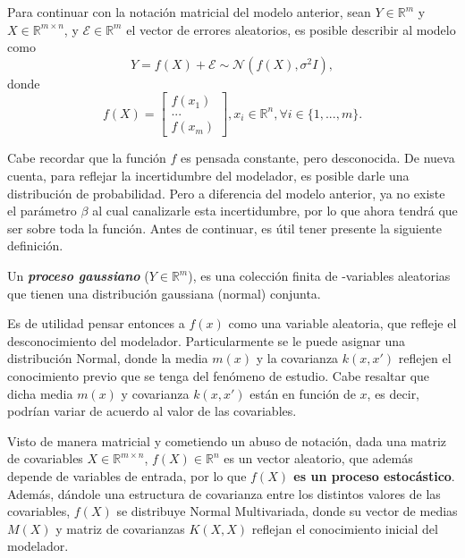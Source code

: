 Para continuar con la notación matricial del modelo anterior, sean $Y \in \mathbb{R}^m$ y $X \in \mathbb{R}^{m \times n}$, y $\mathcal{E} \in \mathbb{R}^m$ el vector de errores aleatorios, es posible describir al modelo como
\begin{equation*}
    Y = f(X) + \mathcal{E} \sim \mathcal{N}(f(X),\sigma^2 I),
\end{equation*}
donde
\begin{equation*}
    f(X) =     
    \left[
        \begin{array}{c}
        f(x_1)  \\
        ... \\
        f(x_m)
        \end{array}
    \right], 
    x_i \in \mathbb{R}^n, \forall i \in \{1,...,m\}.
\end{equation*}

Cabe recordar que la función $f$ es pensada constante, pero desconocida. De nueva cuenta, para reflejar la incertidumbre del modelador, es posible darle una distribución de probabilidad. Pero a diferencia del modelo anterior, ya no existe el parámetro $\beta$ al cual canalizarle esta incertidumbre, por lo que ahora tendrá que ser sobre toda la función. Antes de continuar, es útil tener presente la siguiente definición.

\begin{defin}
    Un \textbf{\textit{proceso gaussiano}} ($Y \in \mathbb{R}^m$), es una colección finita de -variables aleatorias que tienen una distribución gaussiana (normal) conjunta.
\end{defin}

Es de utilidad pensar entonces a $f(x)$ como una variable aleatoria, que refleje el desconocimiento del modelador. Particularmente se le puede asignar una distribución Normal, donde la media $m(x)$ y la covarianza $k(x,x')$ reflejen el conocimiento previo que se tenga del fenómeno de estudio. Cabe resaltar que dicha media $m(x)$ y covarianza $k(x,x')$ están en función de $x$, es decir, podrían variar de acuerdo al valor de las covariables. 

Visto de manera matricial y cometiendo un abuso de notaci\'on, dada una matriz de covariables $X \in \mathbb{R}^{m \times n}$, $f(X) \in \mathbb{R}^n$ es un vector aleatorio, que adem\'as depende de variables de entrada, por lo que \textbf{$f(X)$ es un proceso estoc\'astico}. Adem\'as, d\'andole una estructura de covarianza entre los distintos valores de las covariables, $f(X)$ se distribuye Normal Multivariada, donde su vector de medias $M(X)$ y matriz de covarianzas $K(X,X)$ reflejan el conocimiento inicial del modelador.


